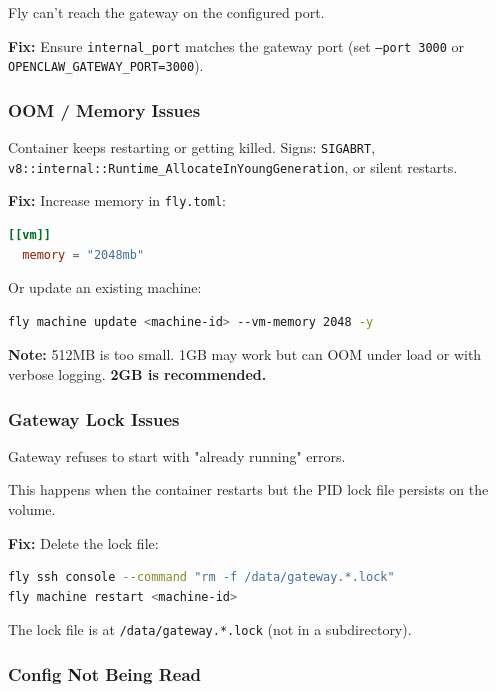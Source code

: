 Fly can't reach the gateway on the configured port.

\textbf{Fix:} Ensure \texttt{internal\_port} matches the gateway port (set \texttt{--port 3000} or \texttt{OPENCLAW\_GATEWAY\_PORT=3000}).

\subsubsection{OOM / Memory Issues}


Container keeps restarting or getting killed. Signs: \texttt{SIGABRT}, \texttt{v8::internal::Runtime\_AllocateInYoungGeneration}, or silent restarts.

\textbf{Fix:} Increase memory in \texttt{fly.toml}:

\begin{lstlisting}[language=toml]
[[vm]]
  memory = "2048mb"
\end{lstlisting}


Or update an existing machine:

\begin{lstlisting}[language=bash]
fly machine update <machine-id> --vm-memory 2048 -y
\end{lstlisting}


\textbf{Note:} 512MB is too small. 1GB may work but can OOM under load or with verbose logging. \textbf{2GB is recommended.}

\subsubsection{Gateway Lock Issues}


Gateway refuses to start with "already running" errors.

This happens when the container restarts but the PID lock file persists on the volume.

\textbf{Fix:} Delete the lock file:

\begin{lstlisting}[language=bash]
fly ssh console --command "rm -f /data/gateway.*.lock"
fly machine restart <machine-id>
\end{lstlisting}


The lock file is at \texttt{/data/gateway.*.lock} (not in a subdirectory).

\subsubsection{Config Not Being Read}


